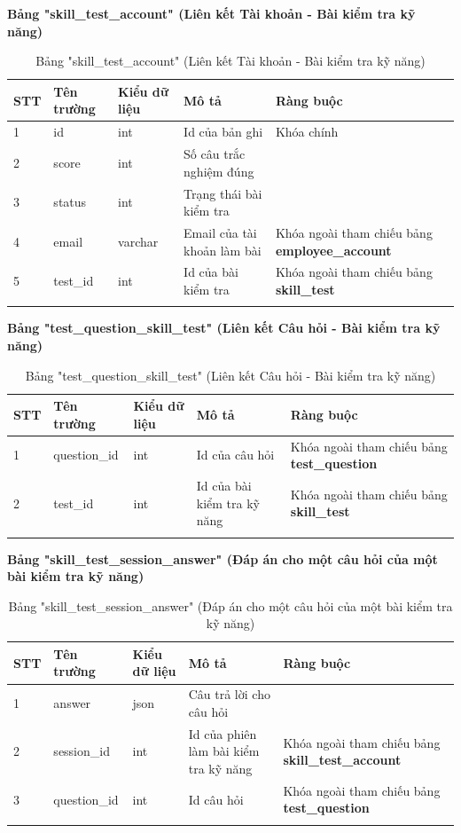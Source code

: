 \documentclass[../DoAn.tex]{subfiles}
\begin{document}
\textbf{Bảng "skill\_test\_account" (Liên kết Tài khoản - Bài kiểm tra kỹ năng)}
\begin{longtable}{|p{}|p{}|p{}|p{}|p{}|}
\hline
\textbf{STT} & \textbf{Tên trường} & \textbf{Kiểu dữ liệu} & \textbf{Mô tả } & \textbf{Ràng buộc} \\ \hline
1   & id & int & Id của bản ghi & Khóa chính \\ \hline
2   & score & int & Số câu trắc nghiệm đúng & \\ \hline
3   & status & int & Trạng thái bài kiểm tra & \\ \hline
4   & email & varchar & Email của tài khoản làm bài & Khóa ngoài tham chiếu bảng \textbf{employee\_account} \\ \hline
5   & test\_id & int & Id của bài kiểm tra & Khóa ngoài tham chiếu bảng \textbf{skill\_test} \\ \hline
\caption{Bảng "skill\_test\_account" (Liên kết Tài khoản - Bài kiểm tra kỹ năng)}
\end{longtable}

\textbf{Bảng "test\_question\_skill\_test" (Liên kết Câu hỏi - Bài kiểm tra kỹ năng)}
\begin{longtable}{|p{}|p{}|p{}|p{}|p{}|}
\hline
\textbf{STT} & \textbf{Tên trường} & \textbf{Kiểu dữ liệu} & \textbf{Mô tả } & \textbf{Ràng buộc} \\ \hline
1   & question\_id & int & Id của câu hỏi & Khóa ngoài tham chiếu bảng \textbf{test\_question} \\ \hline
2   & test\_id & int & Id của bài kiểm tra kỹ năng & Khóa ngoài tham chiếu bảng \textbf{skill\_test} \\ \hline
\caption{Bảng "test\_question\_skill\_test" (Liên kết Câu hỏi - Bài kiểm tra kỹ năng)}
\end{longtable}

\textbf{Bảng "skill\_test\_session\_answer" (Đáp án cho một câu hỏi của một bài kiểm tra kỹ năng)}
\begin{longtable}{|p{}|p{}|p{}|p{}|p{}|}
\hline
\textbf{STT} & \textbf{Tên trường} & \textbf{Kiểu dữ liệu} & \textbf{Mô tả } & \textbf{Ràng buộc} \\ \hline
1   & answer & json & Câu trả lời cho câu hỏi & \\ \hline
2   & session\_id & int & Id của phiên làm bài kiểm tra kỹ năng & Khóa ngoài tham chiếu bảng \textbf{skill\_test\_account} \\ \hline
3   & question\_id & int & Id câu hỏi & Khóa ngoài tham chiếu bảng \textbf{test\_question} \\ \hline
\caption{Bảng "skill\_test\_session\_answer" (Đáp án cho một câu hỏi của một bài kiểm tra kỹ năng)}
\end{longtable}
\end{document}
